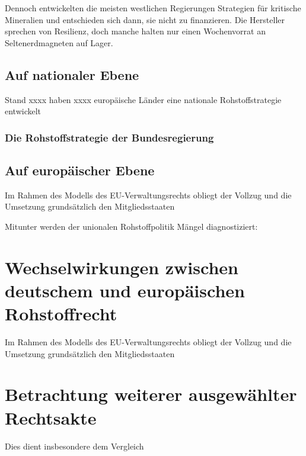 \documentclass[12pt,a4paper,oneside]{book} %
\begin{document}
Dennoch entwickelten die meisten westlichen Regierungen Strategien für kritische Mineralien und entschieden sich dann, sie nicht zu finanzieren. Die Hersteller sprechen von Resilienz, doch manche halten nur einen Wochenvorrat an Seltenerdmagneten auf Lager.

\subsection{Auf nationaler Ebene}
Stand xxxx haben xxxx europäische Länder eine nationale Rohstoffstrategie entwickelt

\subsubsection{Die Rohstoffstrategie der Bundesregierung}

\subsection{Auf europäischer Ebene}

Im Rahmen des Modells des EU-Verwaltungsrechts obliegt der Vollzug und die Umsetzung grundsätzlich den Mitgliedsstaaten


Mitunter werden der unionalen Rohstoffpolitik Mängel diagnostiziert: 

\section{Wechselwirkungen zwischen deutschem und europäischen Rohstoffrecht}
Im Rahmen des Modells des EU-Verwaltungsrechts obliegt der Vollzug und die Umsetzung grundsätzlich den Mitgliedsstaaten

\section{Betrachtung weiterer ausgewählter Rechtsakte}

Dies dient insbesondere dem Vergleich 
\end{document}
